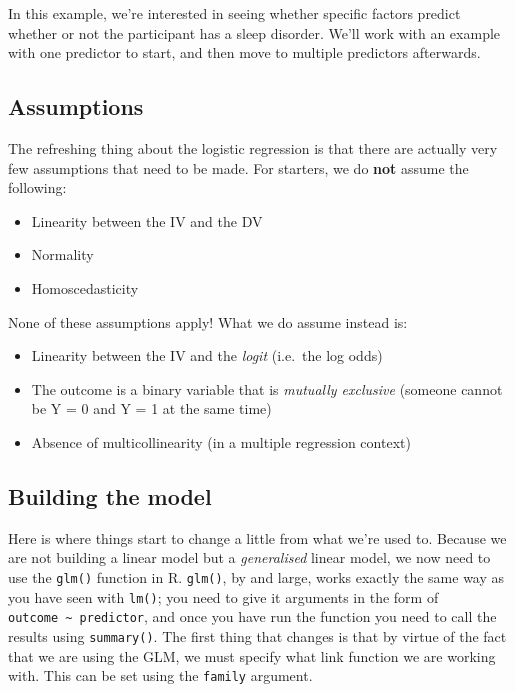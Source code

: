 \documentclass[
]{book}
\providecommand{\tightlist}{%
  \setlength{\itemsep}{0pt}\setlength{\parskip}{0pt}}
\begin{document}
In this example, we're interested in seeing whether specific factors predict whether or not the participant has a sleep disorder. We'll work with an example with one predictor to start, and then move to multiple predictors afterwards.

\hypertarget{assumptions-3}{%
\subsection{Assumptions}\label{assumptions-3}}

The refreshing thing about the logistic regression is that there are actually very few assumptions that need to be made. For starters, we do \textbf{not} assume the following:

\begin{itemize}
\tightlist
\item
  Linearity between the IV and the DV
\item
  Normality
\item
  Homoscedasticity
\end{itemize}

None of these assumptions apply! What we do assume instead is:

\begin{itemize}
\tightlist
\item
  Linearity between the IV and the \emph{logit} (i.e.~the log odds)
\item
  The outcome is a binary variable that is \emph{mutually exclusive} (someone cannot be Y = 0 and Y = 1 at the same time)
\item
  Absence of multicollinearity (in a multiple regression context)
\end{itemize}

\hypertarget{building-the-model}{%
\subsection{Building the model}\label{building-the-model}}

Here is where things start to change a little from what we're used to. Because we are not building a linear model but a \emph{generalised} linear model, we now need to use the \texttt{glm()} function in R. \texttt{glm()}, by and large, works exactly the same way as you have seen with \texttt{lm()}; you need to give it arguments in the form of \texttt{outcome\ \textasciitilde{}\ predictor}, and once you have run the function you need to call the results using \texttt{summary()}. The first thing that changes is that by virtue of the fact that we are using the GLM, we must specify what link function we are working with. This can be set using the \texttt{family} argument.
\end{document}
